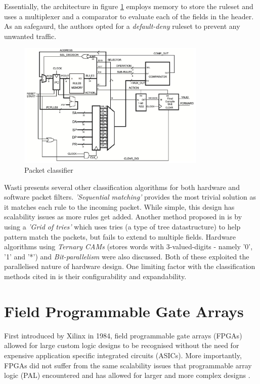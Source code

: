 Essentially, the architecture in figure \ref{fig:fast-fpga-classifier} employs memory to store the ruleset and uses a multiplexer and a comparator to evaluate each of the fields 
in the header. As an safegaurd, the authors opted for a \textit{default-deny} ruleset to prevent any unwanted traffic. 


\begin{figure}[h]
    \centering
    \includegraphics[width=0.8\textwidth]{Images/packetFilterHardware.png}
    \caption[Packet classifier]{Packet classifier \cite{FastRecongifFPGAFirewall}}
    \label{fig:fast-fpga-classifier}
\end{figure}


\newpage

Wasti \cite{Wasti2001HardwareAP} presents several other classification algorithms for both hardware and software packet filters. \textit{'Sequential matching'} provides the most 
trivial solution as it matches each rule to the incoming packet. While simple, this design has scalability issues as more rules get added. Another method proposed in 
\cite{Wasti2001HardwareAP} is by using a \textit{'Grid of tries'} which uses tries (a type of tree datastructure) to help pattern match the packets, but fails to extend to multiple fields. 
Hardware algorithms using \textit{Ternary CAMs} (stores words with 3-valued-digits - namely '0', '1' and '*') and \textit{Bit-parallelism} were also discussed. Both of these 
exploited the parallelised nature of hardware design. One limiting factor with the classification methods cited in \cite{Wasti2001HardwareAP} is their configurability and 
expandability. 








\section{Field Programmable Gate Arrays}
\label{subsection:fpga}	
First introduced by Xilinx in 1984, field programmable gate arrays (FPGAs) allowed for large custom logic designs to be recognised without the need for 
expensive application specific integrated circuits (ASICs). More importantly, FPGAs did not suffer from the same scalability issues that
programmable array logic (PAL) encountered and has allowed for larger and more complex designs \cite{30YearsOfFPGA}. 

